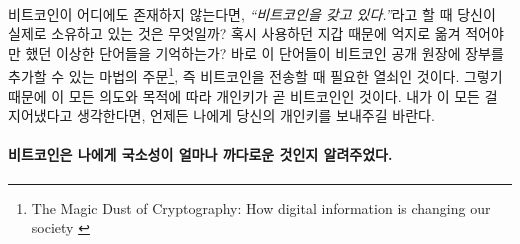 \paragraph{}
비트코인이 어디에도 존재하지 않는다면, \textit{\enquote{비트코인을 갖고 있다.}}라고 할 때 당신이 실제로 소유하고 있는 것은 무엇일까? 
혹시 사용하던 지갑 때문에 억지로 옮겨 적어야만 했던 이상한 단어들을 기억하는가?
바로 이 단어들이 비트코인 공개 원장에 장부를 추가할 수 있는 마법의 주문\footnote{The Magic Dust of Cryptography: How digital
	information is changing our society \cite{gigi:magic-spell}}, 즉 비트코인을 전송할 때 필요한 열쇠인 것이다. 
그렇기 때문에 이 모든 의도와 목적에 따라 개인키가 곧 비트코인인 것이다. 
내가 이 모든 걸 지어냈다고 생각한다면, 언제든 나에게 당신의 개인키를 보내주길 바란다.

\paragraph{비트코인은 나에게 국소성이 얼마나 까다로운 것인지 알려주었다.}

%
%
%
%
%
%
%
